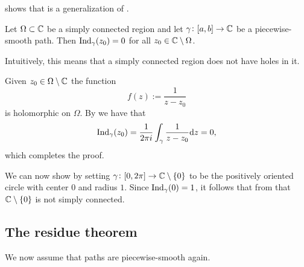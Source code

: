 \documentclass[11pt,a4paper]{article}
\begin{document}
\begin{remark}
   shows that
   is a generalization of
  .
\end{remark}

\begin{corollary}
  \label{cor:simply-connected-implies-no-holes}
  Let $\Omega \subset \mathbb{C}$ be a simply connected region
  and let $\gamma \colon [a,b] \to \mathbb{C}$ be a piecewise-smooth path.
  Then $\operatorname{Ind}_{\gamma}(z_0) = 0$ for all $z_0 \in \mathbb{C} \setminus \Omega$.
\end{corollary}
\begin{remark}
  Intuitively, this means that a simply connected region does not have
  holes in it.
\end{remark}
\begin{proofof}{}
  Given $z_0 \in \Omega \setminus \mathbb{C}$ the function
  \[
    f(z) := \frac{1}{z - z_0}
  \]
  is holomorphic on $\Omega$.
  By  we have that
  \[
    \operatorname{Ind}_{\gamma}(z_0) =
    \frac{1}{2 \pi i} \int_{\gamma} \frac{1}{z - z_0} \mathrm{d} z = 0,
  \]
  which completes the proof.
\end{proofof}
\begin{remark}
  We can now show  by setting
  $\gamma \colon [0,2\pi] \to \mathbb{C} \setminus \left\{0\right\}$ to be the positively
  oriented circle with center $0$ and radius $1$.
  Since $\operatorname{Ind}_{\gamma}(0) = 1$,
  it follows that from 
  that $\mathbb{C} \setminus \left\{0\right\}$ is not simply connected.
\end{remark}

\subsection{The residue theorem}
\begin{remark}
We now assume that paths are piecewise-smooth again.
\end{remark}
\end{document}

